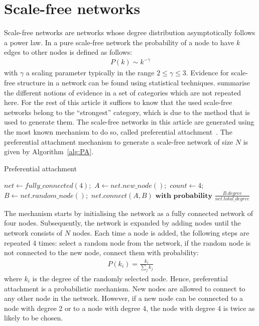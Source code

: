 \documentclass{article}
\begin{document}
\section{Scale-free networks\label{sec:SF}}
Scale-free networks are networks whose degree distribution asymptotically follows a power law. In a pure scale-free
network the probability of a node to have $k$ edges to other nodes is defined as follows:
\begin{align}
    P(k) \sim k^{-\gamma}
\end{align}
with $\gamma$ a scaling parameter typically in the range $2 \leq \gamma \leq 3$. Evidence for scale-free structure in a
network can be found using statistical techniques.  summarise the different
notions of evidence in a set of categories which are not repeated here. For the rest of this article it suffices to
know that the used scale-free networks belong to the ``strongest'' category, which is due to the method that is used to
generate them. The scale-free networks in this article are generated using the most known mechanism to do so, called
preferential attachment~. The preferential attachment mechanism to
generate a scale-free network of size $N$ is given by Algorithm~\ref{alg:PA}.

\begin{algorithm}
    \caption{Preferential attachment \protect{}}\label{alg:PA}
    \begin{algorithmic}[1]
        \State $net \gets fully\_connected(4);$
        \State $A \gets net.new\_node();$
        \State $count \gets 4;$
        \State $B \gets net.random\_node();$
        \State $net.connect(A,B) \textbf{ with probability } \frac{B.degree}{net.total\_degree}$
        \EndIf
        \EndWhile
        \EndWhile
    \end{algorithmic}
\end{algorithm}
\noindent
The mechanism starts by initialising the network as a fully connected network of four nodes. Subsequently, the network
is expanded by adding nodes until the network consists of $N$ nodes. Each time a node is added, the following steps are
repeated 4 times: select a random node from the network, if the random node is not connected to the new node, connect
them with probability:
\begin{align*}
    P(k_i) = \frac{k_i}{\sum_{j} k_j}
\end{align*}
where $k_i$ is the degree of the randomly selected node. Hence, preferential attachment is a probabilistic mechanism.
New nodes are allowed to connect to any other node in the network. However, if a new node can be connected to a node
with degree 2 or to a node with degree 4, the node with degree 4 is twice as likely to be chosen.
\end{document}
